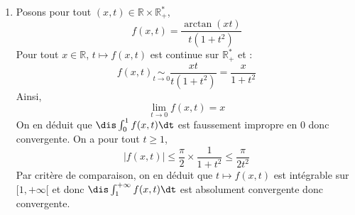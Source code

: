 \documentclass[a4paper,10pt]{report}
\begin{document}
\corr  
\begin{enumerate}
\item Posons pour tout $(x,t) \in \mathbb{R} \times \mathbb{R}_+^{*}$,
$$ f(x,t) = \dfrac{\arctan(xt)}{t(1+t^2)}$$
Pour tout $x \in \mathbb{R}$, $t \mapsto f(x,t)$ est continue sur $\mathbb{R}_+^{*}$ et :
$$ f(x,t) \underset{ t \rightarrow 0 }{\sim} \dfrac{xt}{t(1+t^2)} = \dfrac{x}{1+t^2}$$
Ainsi,
$$ \lim_{t \rightarrow 0 } f(x,t) = x$$
On en déduit que $\dis \int_{0}^1 f(x,t) \dt$ est faussement impropre en $0$ donc convergente. On a pour tout $t \geq 1$,
$$ \vert f(x,t) \vert \leq \dfrac{\pi}{2} \times \dfrac{1}{1+t^2} \leq \dfrac{\pi}{2t^2}$$
Par critère de comparaison, on en déduit que $t \mapsto f(x,t)$ est intégrable sur $[1,+ \infty[$ et donc $\dis \int_{1}^{+ \infty} f(x,t) \dt$ est absolument convergente donc convergente.

\medskip


\end{enumerate}
\end{document}
